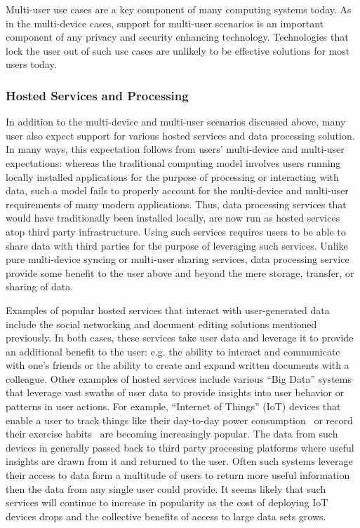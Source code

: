 Multi-user use cases are a key component of many computing systems
today. As in the multi-device cases, support for multi-user scenarios
is an important component of any privacy and security enhancing
technology. Technologies that lock the user out of such use cases are
unlikely to be effective solutions for most users today.

\subsubsection{Hosted Services and Processing}

In addition to the multi-device and multi-user scenarios discussed
above, many user also expect support for various hosted services and
data processing solution. In many ways, this expectation follows from
users' multi-device and multi-user expectations: whereas the
traditional computing model involves users running locally installed
applications for the purpose of processing or interacting with data,
such a model fails to properly account for the multi-device and
multi-user requirements of many modern applications. Thus, data
processing services that would have traditionally been installed
locally, are now run as hosted services atop third party
infrastructure. Using such services requires users to be able to share
data with third parties for the purpose of leveraging such
services. Unlike pure multi-device syncing or multi-user sharing
services, data processing service provide some benefit to the user
above and beyond the mere storage, transfer, or sharing of data.

Examples of popular hosted services that interact with user-generated
data include the social networking and document editing solutions
mentioned previously. In both cases, these services take user data and
leverage it to provide an additional benefit to the user: e.g. the
ability to interact and communicate with one's friends or the ability
to create and expand written documents with a colleague. Other
examples of hosted services include various ``Big Data'' systems that
leverage vast swaths of user data to provide insights into user
behavior or patterns in user actions. For example, ``Internet of
Things'' (IoT) devices that enable a user to track things like their
day-to-day power consumption~\cite{neurio} or record their exercise
habits~\cite{fitbit} are becoming increasingly popular. The data from
such devices in generally passed back to third party processing
platforms where useful insights are drawn from it and returned to the
user. Often such systems leverage their access to data form a
multitude of users to return more useful information then the data
from any single user could provide. It seems likely that such services
will continue to increase in popularity as the cost of deploying IoT
devices drops and the collective benefits of access to large data sets
grows.

